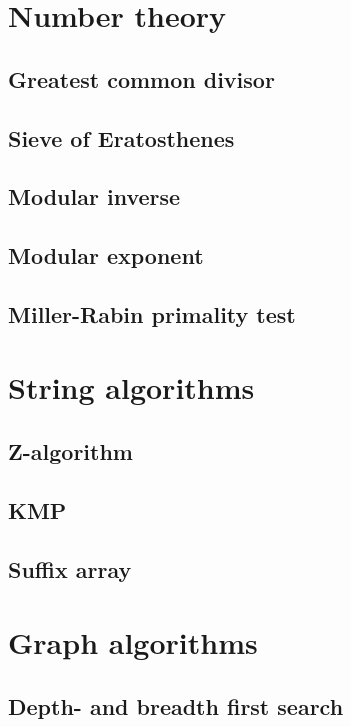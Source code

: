 \documentclass[a4paper,10pt]{article}
\begin{document}
\pagestyle{fancy}
\chead{}
\rhead{\thepage}
\lfoot{}
\cfoot{}
\rfoot{}


\tableofcontents
\newpage
\section{Number theory}
\subsection{Greatest common divisor}

\subsection{Sieve of Eratosthenes}

\subsection{Modular inverse}

\subsection{Modular exponent}

\subsection{Miller-Rabin primality test}
\section{String algorithms}
\subsection{Z-algorithm}
\subsection{KMP}

\subsection{Suffix array}

\section{Graph algorithms}
\subsection{Depth- and breadth first search}

\end{document}
